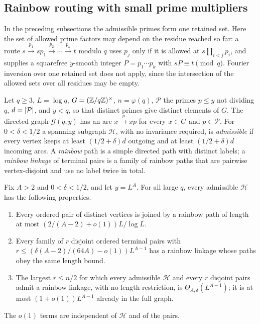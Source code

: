 \subsection{Rainbow routing with small prime multipliers}\label{dir:sec:routing}

In the preceding subsections the admissible primes form one retained set. Here the set of allowed
prime factors may depend on the residue reached so far: a route
$s\xrightarrow{p_1}sp_1\xrightarrow{p_2}\cdots\xrightarrow{p_k}t$ modulo $q$ uses $p_j$ only if it is
allowed at $s\prod_{i<j}p_i$, and supplies a squarefree $y$-smooth integer $P=p_1\cdots p_k$ with
$sP\equiv t\pmod q$. Fourier inversion over one retained set does not apply, since the intersection of
the allowed sets over all residues may be empty.

Let $q\ge3$, $L=\log q$, $G=(\mathbb{Z}/q\mathbb{Z})^\times$, $n=\varphi(q)$, $\mathcal P$ the primes $p\le y$ not
dividing $q$, $d=\lvert\mathcal P\rvert$, and $y<q$, so that distinct primes give distinct elements of $G$. The
directed graph $\mathcal G(q,y)$ has an arc $x\xrightarrow{p}xp$ for every $x\in G$ and $p\in\mathcal P$. For
$0<\delta<1/2$ a spanning subgraph $\mathcal H$, with no invariance required, is \emph{admissible} if every
vertex keeps at least $(1/2+\delta)d$ outgoing and at least $(1/2+\delta)d$ incoming arcs. A \emph{rainbow}
path is a simple directed path with distinct labels; a \emph{rainbow linkage} of terminal pairs is a family of
rainbow paths that are pairwise vertex-disjoint and use no label twice in total.

\begin{theorem}\label{dir:thm:routing}
Fix $A>2$ and $0<\delta<1/2$, and let $y=L^A$. For all large $q$, every admissible $\mathcal H$ has the
following properties.
\begin{enumerate}[label=\textup{(\roman*)}]
\item Every ordered pair of distinct vertices is joined by a rainbow path of length at most
$(2/(A-2)+o(1))L/\log L$.
\item Every family of $r$ disjoint ordered terminal pairs with
$r\le(\delta(A-2)/(64A)-o(1))L^{A-1}$ has a rainbow linkage whose paths obey the same length bound.
\item The largest $r\le n/2$ for which every admissible $\mathcal H$ and every $r$ disjoint pairs admit a
rainbow linkage, with no length restriction, is $\Theta_{A,\delta}(L^{A-1})$; it is at most
$(1+o(1))L^{A-1}$ already in the full graph.
\end{enumerate}
The $o(1)$ terms are independent of $\mathcal H$ and of the pairs.
\end{theorem}

